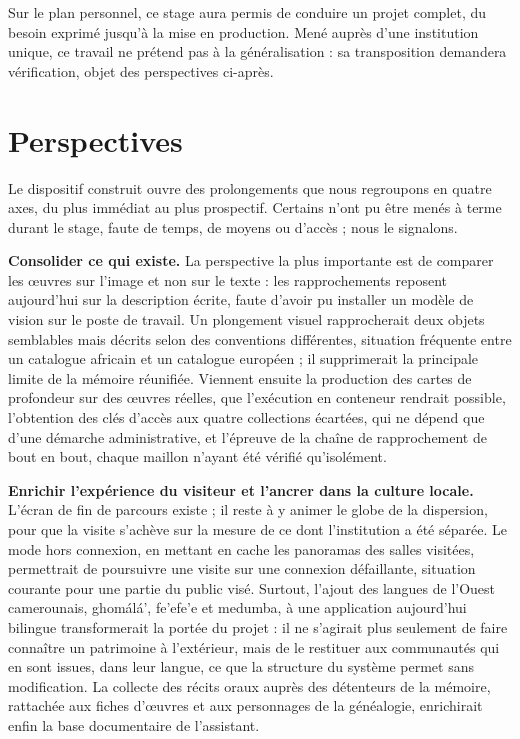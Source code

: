 Sur le plan personnel, ce stage aura permis de conduire un projet complet, du
besoin exprimé jusqu'à la mise en production. Mené auprès d'une institution
unique, ce travail ne prétend pas à la généralisation : sa transposition
demandera vérification, objet des perspectives ci-après.


\section*{Perspectives}

Le dispositif construit ouvre des prolongements que nous regroupons en quatre
axes, du plus immédiat au plus prospectif. Certains n'ont pu être menés à terme
durant le stage, faute de temps, de moyens ou d'accès ; nous le signalons.

\textbf{Consolider ce qui existe.} La perspective la plus importante est de
comparer les œuvres sur l'image et non sur le texte : les rapprochements
reposent aujourd'hui sur la description écrite, faute d'avoir pu installer un
modèle de vision sur le poste de travail. Un plongement visuel rapprocherait
deux objets semblables mais décrits selon des conventions différentes, situation
fréquente entre un catalogue africain et un catalogue européen ; il supprimerait
la principale limite de la mémoire réunifiée. Viennent ensuite la production des
cartes de profondeur sur des œuvres réelles, que l'exécution en conteneur
rendrait possible, l'obtention des clés d'accès aux quatre collections écartées,
qui ne dépend que d'une démarche administrative, et l'épreuve de la chaîne de
rapprochement de bout en bout, chaque maillon n'ayant été vérifié qu'isolément.

\textbf{Enrichir l'expérience du visiteur et l'ancrer dans la culture locale.}
L'écran de fin de parcours existe ; il reste à y animer le globe de la
dispersion, pour que la visite s'achève sur la mesure de ce dont l'institution a
été séparée. Le mode hors connexion, en mettant en cache les panoramas des
salles visitées, permettrait de poursuivre une visite sur une connexion
défaillante, situation courante pour une partie du public visé. Surtout, l'ajout
des langues de l'Ouest camerounais, ghomálá', fe'efe'e et medumba, à une
application aujourd'hui bilingue transformerait la portée du projet : il ne
s'agirait plus seulement de faire connaître un patrimoine à l'extérieur, mais de
le restituer aux communautés qui en sont issues, dans leur langue, ce que la
structure du système permet sans modification. La collecte des récits oraux
auprès des détenteurs de la mémoire, rattachée aux fiches d'œuvres et aux
personnages de la généalogie, enrichirait enfin la base documentaire de
l'assistant.

